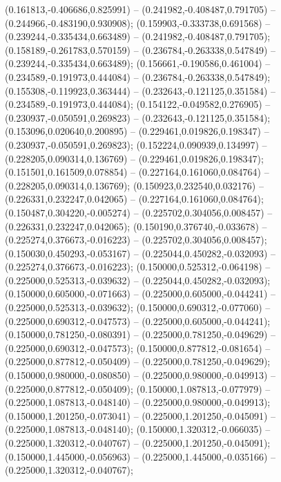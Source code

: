  (0.161813,-0.406686,0.825991) -- (0.241982,-0.408487,0.791705) -- (0.244966,-0.483190,0.930908);
 (0.159903,-0.333738,0.691568) -- (0.239244,-0.335434,0.663489) -- (0.241982,-0.408487,0.791705);
 (0.158189,-0.261783,0.570159) -- (0.236784,-0.263338,0.547849) -- (0.239244,-0.335434,0.663489);
 (0.156661,-0.190586,0.461004) -- (0.234589,-0.191973,0.444084) -- (0.236784,-0.263338,0.547849);
 (0.155308,-0.119923,0.363444) -- (0.232643,-0.121125,0.351584) -- (0.234589,-0.191973,0.444084);
 (0.154122,-0.049582,0.276905) -- (0.230937,-0.050591,0.269823) -- (0.232643,-0.121125,0.351584);
 (0.153096,0.020640,0.200895) -- (0.229461,0.019826,0.198347) -- (0.230937,-0.050591,0.269823);
 (0.152224,0.090939,0.134997) -- (0.228205,0.090314,0.136769) -- (0.229461,0.019826,0.198347);
 (0.151501,0.161509,0.078854) -- (0.227164,0.161060,0.084764) -- (0.228205,0.090314,0.136769);
 (0.150923,0.232540,0.032176) -- (0.226331,0.232247,0.042065) -- (0.227164,0.161060,0.084764);
 (0.150487,0.304220,-0.005274) -- (0.225702,0.304056,0.008457) -- (0.226331,0.232247,0.042065);
 (0.150190,0.376740,-0.033678) -- (0.225274,0.376673,-0.016223) -- (0.225702,0.304056,0.008457);
 (0.150030,0.450293,-0.053167) -- (0.225044,0.450282,-0.032093) -- (0.225274,0.376673,-0.016223);
 (0.150000,0.525312,-0.064198) -- (0.225000,0.525313,-0.039632) -- (0.225044,0.450282,-0.032093);
 (0.150000,0.605000,-0.071663) -- (0.225000,0.605000,-0.044241) -- (0.225000,0.525313,-0.039632);
 (0.150000,0.690312,-0.077060) -- (0.225000,0.690312,-0.047573) -- (0.225000,0.605000,-0.044241);
 (0.150000,0.781250,-0.080391) -- (0.225000,0.781250,-0.049629) -- (0.225000,0.690312,-0.047573);
 (0.150000,0.877812,-0.081654) -- (0.225000,0.877812,-0.050409) -- (0.225000,0.781250,-0.049629);
 (0.150000,0.980000,-0.080850) -- (0.225000,0.980000,-0.049913) -- (0.225000,0.877812,-0.050409);
 (0.150000,1.087813,-0.077979) -- (0.225000,1.087813,-0.048140) -- (0.225000,0.980000,-0.049913);
 (0.150000,1.201250,-0.073041) -- (0.225000,1.201250,-0.045091) -- (0.225000,1.087813,-0.048140);
 (0.150000,1.320312,-0.066035) -- (0.225000,1.320312,-0.040767) -- (0.225000,1.201250,-0.045091);
 (0.150000,1.445000,-0.056963) -- (0.225000,1.445000,-0.035166) -- (0.225000,1.320312,-0.040767);
